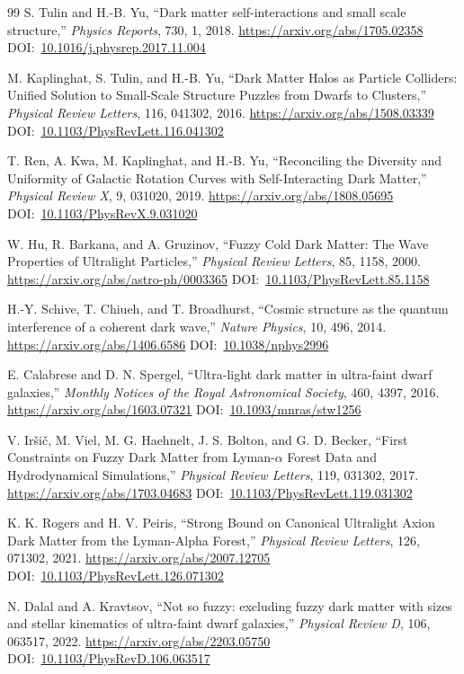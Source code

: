 \documentclass[10pt,onecolumn]{article}
\newcommand{\doi}[1]{DOI:~\href{https://doi.org/#1}{#1}}
\begin{document}
\begin{thebibliography}{99}
S. Tulin and H.-B. Yu,
``Dark matter self-interactions and small scale structure,''
\emph{Physics Reports}, 730, 1, 2018.
\url{https://arxiv.org/abs/1705.02358}
\doi{10.1016/j.physrep.2017.11.004}

M. Kaplinghat, S. Tulin, and H.-B. Yu,
``Dark Matter Halos as Particle Colliders: Unified Solution to Small-Scale Structure Puzzles from Dwarfs to Clusters,''
\emph{Physical Review Letters}, 116, 041302, 2016.
\url{https://arxiv.org/abs/1508.03339}
\doi{10.1103/PhysRevLett.116.041302}

T. Ren, A. Kwa, M. Kaplinghat, and H.-B. Yu,
``Reconciling the Diversity and Uniformity of Galactic Rotation Curves with Self-Interacting Dark Matter,''
\emph{Physical Review X}, 9, 031020, 2019.
\url{https://arxiv.org/abs/1808.05695}
\doi{10.1103/PhysRevX.9.031020}

W. Hu, R. Barkana, and A. Gruzinov,
``Fuzzy Cold Dark Matter: The Wave Properties of Ultralight Particles,''
\emph{Physical Review Letters}, 85, 1158, 2000.
\url{https://arxiv.org/abs/astro-ph/0003365}
\doi{10.1103/PhysRevLett.85.1158}

H.-Y. Schive, T. Chiueh, and T. Broadhurst,
``Cosmic structure as the quantum interference of a coherent dark wave,''
\emph{Nature Physics}, 10, 496, 2014.
\url{https://arxiv.org/abs/1406.6586}
\doi{10.1038/nphys2996}

E. Calabrese and D. N. Spergel,
``Ultra-light dark matter in ultra-faint dwarf galaxies,''
\emph{Monthly Notices of the Royal Astronomical Society}, 460, 4397, 2016.
\url{https://arxiv.org/abs/1603.07321}
\doi{10.1093/mnras/stw1256}

V. Ir\v{s}i\v{c}, M. Viel, M. G. Haehnelt, J. S. Bolton, and G. D. Becker,
``First Constraints on Fuzzy Dark Matter from Lyman-$\alpha$ Forest Data and Hydrodynamical Simulations,''
\emph{Physical Review Letters}, 119, 031302, 2017.
\url{https://arxiv.org/abs/1703.04683}
\doi{10.1103/PhysRevLett.119.031302}

K. K. Rogers and H. V. Peiris,
``Strong Bound on Canonical Ultralight Axion Dark Matter from the Lyman-Alpha Forest,''
\emph{Physical Review Letters}, 126, 071302, 2021.
\url{https://arxiv.org/abs/2007.12705}
\doi{10.1103/PhysRevLett.126.071302}

N. Dalal and A. Kravtsov,
``Not so fuzzy: excluding fuzzy dark matter with sizes and stellar kinematics of ultra-faint dwarf galaxies,''
\emph{Physical Review D}, 106, 063517, 2022.
\url{https://arxiv.org/abs/2203.05750}
\doi{10.1103/PhysRevD.106.063517}


\end{thebibliography}
\end{document}
